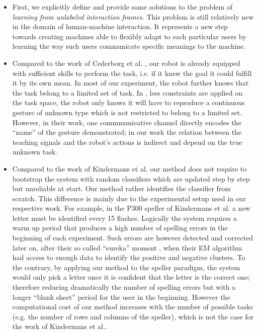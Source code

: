 \begin{itemize}

\item First, we explicitly define and provide some solutions to the problem of \emph{learning from unlabeled interaction frames}. This problem is still relatively new in the domain of human-machine interaction. It represents a new step towards creating machines able to flexibly adapt to each particular users by learning the way such users communicate specific meanings to the machine.

\item Compared to the work of Cederborg et al. \cite{cederborg2011imitating}, our robot is already equipped with sufficient skills to perform the task, i.e. if it knew the goal it could fulfill it by its own mean. In most of our experiment, the robot further knows that the task belong to a limited set of task. In \cite{cederborg2011imitating}, less constraints are applied on the task space, the robot only knows it will have to reproduce a continuous gesture of unknown type which is not restricted to belong to a limited set. However, in their work, one commmunicative channel directly encodes the ``name'' of the gesture demonstrated; in our work the relation between the teaching signals and the robot's actions is indirect and depend on the true unknown task.

\item Compared to the work of Kindermans et al. \cite{Kindermans2012a,kindermans2014integrating} our method does not require to bootstrap the system with random classifiers which are updated step by step but unreliable at start. Our method rather identifies the classifier from scratch. This difference is mainly due to the experimental setup used in our respective work. For example, in the P300 speller of Kindermans et al. a new letter must be identified every 15 flashes. Logically the system requires a warm up period that produces a high number of spelling errors in the beginning of each experiment. Such errors are however detected and corrected later on, after their so called ``eureka'' moment \cite{Kindermans2012a}, when their EM algorithm had access to enough data to identify the positive and negative clusters. To the contrary, by applying our method to the speller paradigm, the system would only pick a letter once it is confident that the letter is the correct one; therefore reducing dramatically the number of spelling errors but with a longer ``blank sheet'' period for the user in the beginning. However the computational cost of our method increases with the number of possible tasks (e.g. the number of rows and columns of the speller), which is not the case for the work of Kindermans et al..


\end{itemize}
